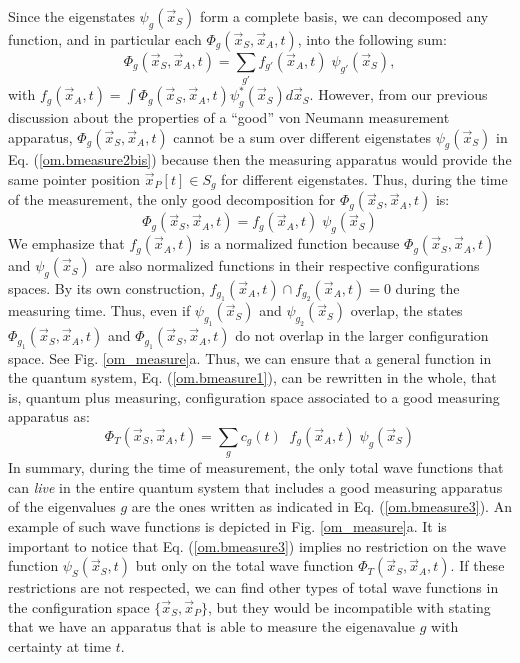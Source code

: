 \documentclass[onecolumn,nofootinbib, secnumarabic, amsmath, nobibnotes,12pt,aps,pra]{revtex4-1}
\newcommand{\fref}[1]{Fig. \ref{#1}}
\newcommand{\eref}[1]{Eq. (\ref{#1})}
\begin{document}
Since the eigenstates $\psi_g(\vec x_S)$ form a complete basis, we can decomposed any function, and in particular each $\Phi_g(\vec x_S,\vec x_A,t)$, into the following sum:
\begin{equation}
\Phi_g(\vec x_S,\vec x_A,t) = \sum_{g'} f_{g'}(\vec x_A,t) \; \psi_{g'}(\vec x_S)
\label{om.bmeasure2bis},
\end{equation}
with $ f_g(\vec x_A,t) = \int \Phi_g(\vec x_S,\vec x_A,t)
\psi^*_g(\vec x_S) d\vec x_S$. However, from our previous discussion
about the properties of a ``good'' von Neumann measurement
apparatus, $\Phi_g(\vec x_S,\vec x_A,t)$ cannot be a sum over
different eigenstates $\psi_g(\vec x_S)$ in \eref{om.bmeasure2bis}
because then the measuring apparatus would provide the same pointer
position $\vec x_P[t]\in S_{g}$ for different eigenstates. Thus, during the time of the measurement, the
only good decomposition for $\Phi_g(\vec x_S,\vec x_A,t)$ is:
\begin{equation}
\Phi_g(\vec x_S,\vec x_A,t) = f_g(\vec x_A,t) \; \psi_g(\vec x_S)
\label{om.bmeasure2}
\end{equation}
We emphasize that $ f_g(\vec x_A,t)$ is a normalized function because $\Phi_g(\vec x_S,\vec x_A,t)$ and $\psi_g(\vec x_S)$ are also normalized functions in their respective configurations spaces. By its own construction, $f_{g_1}(\vec x_A,t) \cap f_{g_2}(\vec x_A,t) = 0$ during the measuring time. Thus, even if $\psi_{g_1}(\vec x_S)$ and $\psi_{g_2}(\vec x_S)$ overlap, the states $\Phi_{g_1}(\vec x_S,\vec x_A,t)$ and $\Phi_{g_1}(\vec x_S,\vec x_A,t)$ do not overlap in the larger configuration space. See \fref{om_measure}a. Thus, we can ensure that a general function in the quantum system, \eref{om.bmeasure1}, can be rewritten in the whole, that is, quantum plus measuring, configuration space associated to a good measuring apparatus as:
\begin{equation}
\Phi_T(\vec x_S,\vec x_A,t) = \sum_{g} c_g(t) \;\; f_g(\vec x_A,t) \; \psi_g(\vec x_S)
\label{om.bmeasure3}
\end{equation}
In summary, during the time of measurement, the only total wave
functions that can \textit{live} in the entire quantum system that
includes a good measuring apparatus of the eigenvalues $g$ are the
ones written as indicated in \eref{om.bmeasure3}. An example of such
wave functions is depicted in \fref{om_measure}a. It is important to
notice that \eref{om.bmeasure3} implies no restriction on the wave
function $\psi_S(\vec x_S,t)$ but only on the total wave function
$\Phi_T(\vec x_S,\vec x_A,t)$. If these restrictions are not
respected, we can find other types of total wave functions in the
configuration space $\{\vec x_S,\vec x_P\}$, but they would be
incompatible with stating that we have an apparatus that is able to
measure the eigenavalue $g$ with certainty at time $t$.
\end{document}
